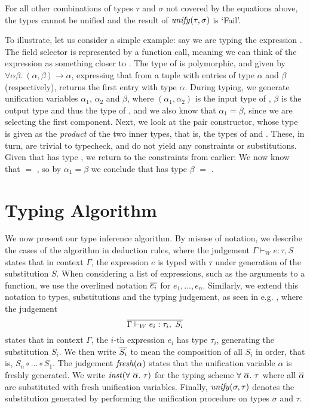 For all other combinations of types $\tau$ and $\sigma$ not covered by the
equations above, the types cannot be unified and the result of
$\mathit{unify}(\tau,\sigma)$ is `\textsf{Fail}'.


To illustrate, let us consider a simple example: say we are typing the
expression . The field selector  is represented by a
function call, meaning we can think of the expression as something
closer to . The type of  is polymorphic, and
given by $\forall \alpha \beta.\ (\alpha,\beta) \to \alpha$, expressing that
from a tuple with entries of type $\alpha$ and $\beta$ (respectively),
 returns the first entry with type $\alpha$.
During typing, we generate unification variables $\alpha_1$, $\alpha_2$ and
$\beta$, where $(\alpha_1,\alpha_2)$ is the input type of , $\beta$
is the output type and thus the type of , and we also know
that $\alpha_1 = \beta$, since we are selecting the first component.
Next, we look at the pair constructor, whose type is given as the \emph{product}
of the two inner types, that is, the types of  and .
These, in turn, are trivial to typecheck, and do not yield any constraints or
substitutions. Given that  has type , we return
to the constraints from earlier:
We now know that  $=$ , so by
$\alpha_1 = \beta$ we conclude that  has type
$\beta$ $=$ .



\section{Typing Algorithm}

We now present our type inference algorithm. By misuse of notation, we describe
the cases of the algorithm in deduction rules, where the judgement
$\Gamma \vdash_W e : \tau, S$ states that in context $\Gamma$, the expression $e$
is typed with $\tau$ under generation of the substitution $S$.
When considering a list of expressions, such as the arguments to a function, we
use the overlined notation $\overline{e_i}$ for $e_1,\dots,e_n$. Similarly, we
extend this notation to types, substitutions and the typing judgement, as seen
in e.g. , where the judgement
\[ \overline{ \Gamma \vdash_W e_i : \tau_i,\ S_i } \]
states that in context $\Gamma$, the $i$-th expression $e_i$ has type $\tau_i$,
generating the substitution $S_i$. We then write $\overline{S_i}$ to mean the
composition of all $S_i$ in order, that is, $S_n \circ \dots \circ S_1$.
The judgement $\mathit{fresh}(\alpha)$ states that the unification variable $\alpha$ is
freshly generated. We write $\inst(\forall\ \set{\alpha}.\ \tau)$ for the
typing scheme $\forall\ \overline{\alpha}.\ \tau$ where all $\overline{\alpha}$ are
substituted with fresh unification variables.
Finally, $\mathit{unify}(\sigma,\tau)$ denotes the substitution generated by performing
the unification procedure on types $\sigma$ and $\tau$.


